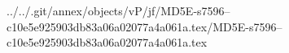 ../../.git/annex/objects/vP/jf/MD5E-s7596--c10e5e925903db83a06a02077a4a061a.tex/MD5E-s7596--c10e5e925903db83a06a02077a4a061a.tex